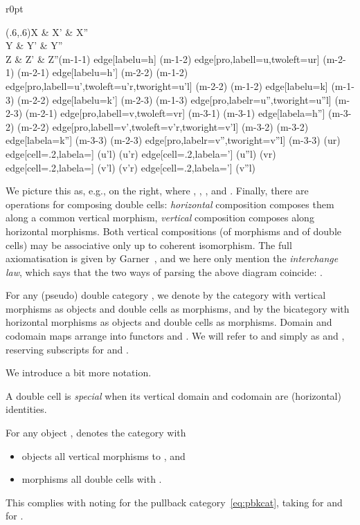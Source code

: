 \documentclass{LMCS}
\theoremstyle{plain}\newtheorem{satz}[thm]{Satz}
\begin{document}
\begin{wrapfigure}[6]{r}{0pt}
  \begin{minipage}[t][3em]{0.28\linewidth}
    \vspace*{-1.6em}\Diag(.6,.6){}{X \& X' \& X'' \\
    Y \& Y' \& Y'' \\
    Z \& Z' \& Z''}{(m-1-1) edge[labelu={h}] (m-1-2) edge[pro,labell={u},twoleft={ur}{}] (m-2-1) (m-2-1) edge[labelu={h'}] (m-2-2) (m-1-2) edge[pro,labell={u'},twoleft={u'r}{},tworight={u'l}{}] (m-2-2) (m-1-2) edge[labelu={k}] (m-1-3) (m-2-2) edge[labelu={k'}] (m-2-3) (m-1-3) edge[pro,labelr={u''},tworight={u''l}{}] (m-2-3) (m-2-1) 
    edge[pro,labell={v},twoleft={vr}{}] (m-3-1) (m-3-1) edge[labela={h''}] (m-3-2) (m-2-2) edge[pro,labell={v'},twoleft={v'r}{},tworight={v'l}{}] (m-3-2) (m-3-2) edge[labela={k''}] (m-3-3) (m-2-3) edge[pro,labelr={v''},tworight={v''l}{}] (m-3-3) (ur) edge[cell={.2},labela={\alpha}] (u'l) (u'r) edge[cell={.2},labela={\alpha'}] (u''l) (vr) edge[cell={.2},labela={\beta}] (v'l) (v'r) edge[cell={.2},labela={\beta'}] (v''l) }
  \end{minipage}
\end{wrapfigure}
We picture this as, e.g.,  on the right, where , , , and . Finally, there are operations for composing double
cells: \emph{horizontal} composition  composes them along a
common vertical morphism, \emph{vertical} composition 
composes along horizontal morphisms. Both vertical compositions (of
morphisms and of double cells) may be associative only up to coherent
isomorphism. The full axiomatisation is given by
Garner~\cite{GarnerPhD}, and we here only mention the
\emph{interchange law}, which says that the two ways of parsing the
above diagram coincide: .

For any (pseudo) double category , we denote by  the category
with vertical morphisms as objects and double cells as morphisms, and
by  the bicategory with horizontal morphisms as objects and
double cells as morphisms.  Domain and codomain maps arrange into
functors  and . We will refer to  and  simply as 
and , reserving subscripts for  and .

We introduce a bit more notation.
\begin{defi}
  A double cell 
is \emph{special} when its vertical domain and codomain are (horizontal) identities.
\end{defi}
For any object ,  denotes the category with
\begin{itemize}
\item objects all vertical morphisms to , and
\item morphisms  all double cells 
   with .
\end{itemize}
This complies with noting  for the pullback category~\eqref{eq:pbkcat}, taking 
 for  and  for .
\end{document}
